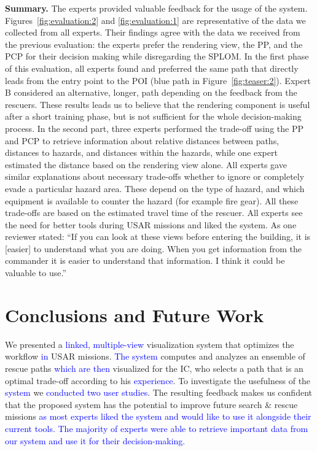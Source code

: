\documentclass{egpubl}
\newcommand{\diff}[1]{\textcolor{blue}{#1}}
\begin{document}
%
\textbf{Summary.} The experts provided valuable feedback for the usage of the system. Figures~\ref{fig:evaluation:2} and \ref{fig:evaluation:1} are representative of the data we collected from all experts. Their findings agree with the data we received from the previous evaluation: the experts prefer the rendering view, the PP, and the PCP for their decision making while disregarding the SPLOM. In the first phase of this evaluation, all experts found and preferred the same path that directly leads from the entry point to the POI (blue path in Figure~\ref{fig:teaser:2}). Expert B considered an alternative, longer, path depending on the feedback from the rescuers. These results leads us to believe that the rendering component is useful after a short training phase, but is not sufficient for the whole decision-making process. In the second part, three experts performed the trade-off using the PP and PCP to retrieve information about relative distances between paths, distances to hazards, and distances within the hazards, while one expert estimated the distance based on the rendering view alone. All experts gave similar explanations about necessary trade-offs whether to ignore or completely evade a particular hazard area. These depend on the type of hazard, and which equipment is available to counter the hazard (for example fire gear). All these trade-offs are based on the estimated travel time of the rescuer. All experts see the need for better tools during USAR missions and liked the system. As one reviewer stated: ``If you can look at these views before entering the building, it is [easier] to understand what you are doing. When you get information from the commander it is easier to understand that information. I think it could be valuable to use.''



\section{Conclusions and Future Work} \label{sec:conclusion}
We presented a \diff{linked, multiple-view} visualization system that optimizes the workflow \diff{in} USAR missions. \diff{The system} computes and analyzes an ensemble of rescue paths \diff{which are then} visualized for the IC, who selects a path that is an optimal trade-off according to his \diff{experience}. To investigate the usefulness of the \diff{system} we \diff{conducted two user studies}. The resulting feedback makes us confident that the proposed system has the potential to improve future search \& rescue missions \diff{as most experts liked the system and would like to use it alongside their current tools. The majority of experts were able to retrieve important data from our system and use it for their decision-making.}
\end{document}
